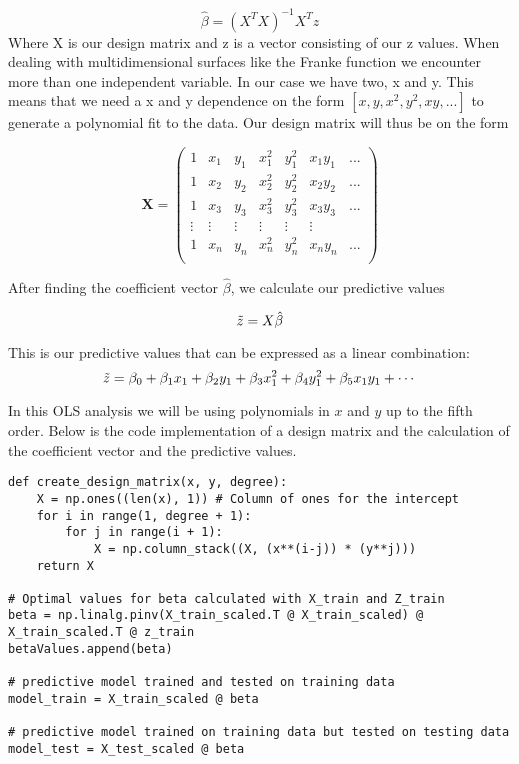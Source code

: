 \documentclass{article}
\begin{document}
\begin{equation}
    \hat{\beta} = (X^TX)^{-1}X^Tz
\end{equation}
\newline
Where X is our design matrix and z is a vector consisting of our z values. When dealing with multidimensional surfaces like the Franke function we encounter more than one independent variable. In our case we have two, x and y. This means that we need a x and y dependence on the form \([x,y,x^2,y^2,xy,...]\) to generate a polynomial fit to the data. Our design matrix will thus be on the form 
\newline

\[
\mathbf{X} =
\begin{pmatrix}
1 & x_1 & y_1 & x_1^2 & y_1^2 & x_1 y_1 & ...\\
1 & x_2 & y_2 & x_2^2 & y_2^2 & x_2 y_2 & ...\\
1 & x_3 & y_3 & x_3^2 & y_3^2 & x_3 y_3 & ...\\
\vdots & \vdots & \vdots & \vdots & \vdots & \vdots \\
1 & x_n & y_n & x_n^2 & y_n^2 & x_n y_n & ...\\
\end{pmatrix}
\]
\newline




After finding the coefficient vector \(\hat{\beta}\), we calculate our predictive values 


\begin{equation}
    \Tilde{z} = X\hat{\beta}
\end{equation}
\newline


This is our predictive values that can be expressed as a linear combination:  
\[
\Tilde{z} = \beta_0 + \beta_1 x_1 + \beta_2 y_1 + \beta_3 x_1^2 + \beta_4 y_1^2 + \beta_5 x_1 y_1 + \cdots
\]
\newpage

In this OLS analysis we will be using polynomials in \(x\) and \(y\) up to the fifth order. Below is the code implementation of a design matrix and the calculation of the coefficient vector and the predictive values.

\begin{verbatim}
def create_design_matrix(x, y, degree):
    X = np.ones((len(x), 1)) # Column of ones for the intercept  
    for i in range(1, degree + 1):
        for j in range(i + 1):
            X = np.column_stack((X, (x**(i-j)) * (y**j)))
    return X

# Optimal values for beta calculated with X_train and Z_train
beta = np.linalg.pinv(X_train_scaled.T @ X_train_scaled) @ X_train_scaled.T @ z_train 
betaValues.append(beta)
    
# predictive model trained and tested on training data 
model_train = X_train_scaled @ beta

# predictive model trained on training data but tested on testing data
model_test = X_test_scaled @ beta
\end{verbatim}
\vspace{0.7cm}
\end{document}
